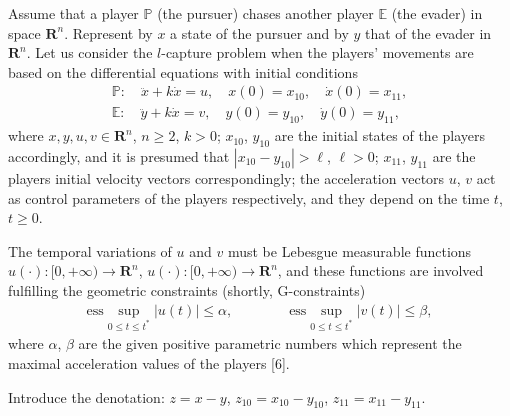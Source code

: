 \documentclass[12pt]{llncs}
\begin{document}
Assume that a player $\mathbb P$ (the pursuer) chases another player $\mathbb E$ (the evader) in space $\mathbf R^n$. Represent by $x$ a state of the pursuer and by $y$ that of the evader in $\mathbf R^n$. Let us consider the $l$-capture problem when the players' movements are based on the differential equations with initial conditions
\begin{gather*}
\mathbb{P}:\quad \ddot{x}+k\dot{x}=u,\quad x(0)=x_{10},\quad \dot{x}(0)=x_{11}, \\
\mathbb{E}:\quad \ddot{y}+k\dot{x}=v,\quad y(0)=y_{10},\quad \dot{y}(0)=y_{11},
\end{gather*}
where $x, y, u, v \in \mathbf{R}^n$, $n\geq2$, $k>0$; $x_{10}$, $y_{10}$ are the initial states of the players accordingly, and it is presumed that $|x_{10}-y_{10}|>\ell$, $\ell>0$; $x_{11}$, $y_{11}$ are the players initial velocity vectors correspondingly; the acceleration vectors $u$, $v$ act as control parameters of the players respectively, and they depend on the time $t$, $t\geq0$.

The temporal variations of $u$ and $v$ must be Lebesgue measurable functions $u(\cdot):[0,+\infty)\rightarrow\mathbf R^n$, $u(\cdot):[0,+\infty)\rightarrow\mathbf R^n$, and these functions are involved fulfilling the geometric constraints (shortly, G-constraints)\
\begin{gather*}
\mbox{ess}\sup_{0\leq t\leq t^*}|u(t)|\leq \alpha, \quad \quad \quad \quad
\mbox{ess}\sup_{0\leq t\leq t^*}|v(t)|\leq \beta,
\end{gather*}
where $\alpha$, $\beta$ are the given positive parametric numbers which represent the maximal acceleration values of the players [6].

Introduce the denotation: $z=x-y$, $z_{10}=x_{10}-y_{10}$, $z_{11}=x_{11}-y_{11}$.
\end{document}
